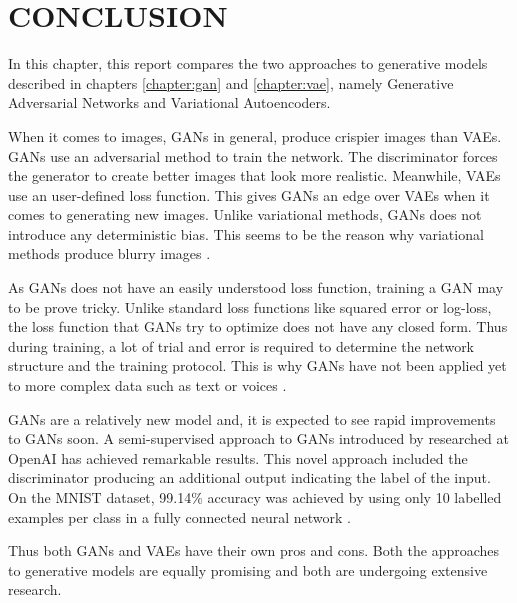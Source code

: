 \chapter{CONCLUSION}
\label{chapter:conclusion}
\begin{onehalfspace}
    In this chapter, this report compares the two approaches to generative 
    models described in chapters \ref{chapter:gan} and \ref{chapter:vae}, 
    namely Generative Adversarial Networks and Variational Autoencoders. 

    When it comes to images, GANs in general, produce crispier images than VAEs. 
    GANs use an adversarial method to train the network. The discriminator forces 
    the generator to create better images that look more realistic. Meanwhile, VAEs 
    use an user-defined loss function. This gives GANs an edge over VAEs when it 
    comes to generating new images. Unlike variational methods, GANs does not 
    introduce any deterministic bias. This seems to be the reason why variational 
    methods produce blurry images \cite{gan_quora_iang}.

    As GANs does not have an easily understood loss function, training a GAN may 
    to be prove tricky. Unlike standard loss functions like squared error or 
    log-loss, the loss function that GANs try to optimize does not have any closed 
    form. Thus during training, a lot of trial and error is required to determine 
    the network structure and the training protocol. This is why GANs have not been 
    applied yet to more complex data such as text or 
    voices \cite{gan_quora_chatviri}.

    GANs are a relatively new model and, it is expected to see rapid 
    improvements to GANs soon. A semi-supervised approach to GANs \cite{improvedGANs} 
    introduced by researched at OpenAI has achieved remarkable results. 
    This novel approach included the discriminator producing an additional 
    output indicating the label of the input. On the MNIST\cite{mnist} dataset, 99.14\% 
    accuracy was achieved by using only 10 labelled examples per class in a 
    fully connected neural network \cite{openai_genmodels}.

    Thus both GANs and VAEs have their own pros and cons. Both the approaches 
    to generative models are equally promising and both are undergoing extensive 
    research. 
\end{onehalfspace}